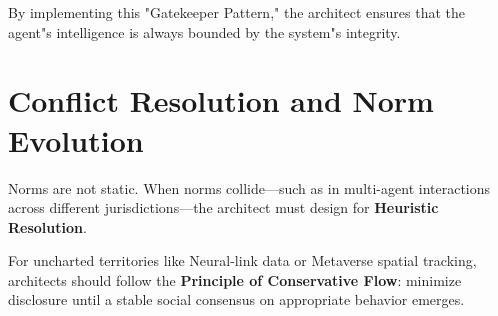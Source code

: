 By implementing this "Gatekeeper Pattern," the architect ensures that the agent"s intelligence is always bounded by the system"s integrity.

\section{Conflict Resolution and Norm Evolution}
\label{sec:ci_conflicts}

Norms are not static. When norms collide---such as in multi-agent interactions across different jurisdictions---the architect must design for \textbf{Heuristic Resolution}. 

For uncharted territories like Neural-link data or Metaverse spatial tracking, architects should follow the \textbf{Principle of Conservative Flow}: minimize disclosure until a stable social consensus on appropriate behavior emerges.